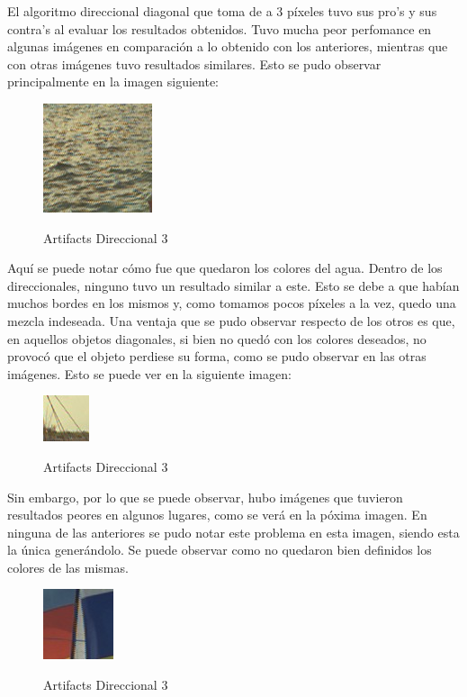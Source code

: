 \documentclass[10pt, a4paper]{article}
\begin{document}
El algoritmo direccional diagonal que toma de a 3 p\'ixeles tuvo sus pro's y sus contra's al evaluar los resultados obtenidos. Tuvo mucha peor perfomance en algunas im\'agenes en comparaci\'on a lo obtenido con los anteriores, mientras que con otras im\'agenes tuvo resultados similares. Esto se pudo observar principalmente en la imagen siguiente:

\begin{figure}[H]
\centering
	{\includegraphics[scale=1.30]{5Subj2}}
	\caption{Artifacts Direccional 3} 
\end{figure}

Aqu\'i se puede notar c\'omo fue que quedaron los colores del agua. Dentro de los direccionales, ninguno tuvo un resultado similar a este. Esto se debe a que hab\'ian muchos bordes en los mismos y, como tomamos pocos p\'ixeles a la vez, quedo una mezcla indeseada. Una ventaja que se pudo observar respecto de los otros es que, en aquellos objetos diagonales, si bien no qued\'o con los colores deseados, no provoc\'o que el objeto perdiese su forma, como se pudo observar en las otras im\'agenes. Esto se puede ver en la siguiente imagen:

\begin{figure}[H]
\centering
	{\includegraphics[scale=2.3]{5Subj3}}
	\caption{Artifacts Direccional 3} 
\end{figure}

Sin embargo, por lo que se puede observar, hubo im\'agenes que tuvieron resultados peores en algunos lugares, como se ver\'a en la p\'oxima imagen. En ninguna de las anteriores se pudo notar este problema en esta imagen, siendo esta la \'unica gener\'andolo. Se puede observar como no quedaron bien definidos los colores de las mismas. 

\begin{figure}[H]
\centering
	{\includegraphics[scale=1.6]{5Subj1}}
	\caption{Artifacts Direccional 3} 
\end{figure}
\end{document}
